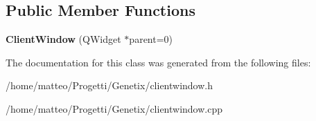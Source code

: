 \subsection*{Public Member Functions}
\begin{DoxyCompactItemize}
\item 
\mbox{\label{classClientWindow_a7155f4a6425594dfaf7346575fcf3b40}} 
{\bfseries Client\+Window} (Q\+Widget $\ast$parent=0)
\end{DoxyCompactItemize}


The documentation for this class was generated from the following files\+:\begin{DoxyCompactItemize}
\item 
/home/matteo/\+Progetti/\+Genetix/clientwindow.\+h\item 
/home/matteo/\+Progetti/\+Genetix/clientwindow.\+cpp\end{DoxyCompactItemize}
